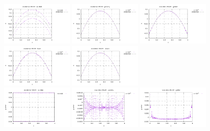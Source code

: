 \begin{center}
\includegraphics[width=3.4cm]{python_codes/fieldstone_115/results/dh/pressure_nostab.pdf}
\includegraphics[width=3.4cm]{python_codes/fieldstone_115/results/dh/pressure_penalty.pdf}
\includegraphics[width=3.4cm]{python_codes/fieldstone_115/results/dh/pressure_global.pdf}
\includegraphics[width=3.4cm]{python_codes/fieldstone_115/results/dh/pressure_local.pdf}
\includegraphics[width=3.4cm]{python_codes/fieldstone_115/results/dh/pressure_macro.pdf}\\
\includegraphics[width=3.4cm]{python_codes/fieldstone_115/results/dh/pressure_nostab_error.pdf}
\includegraphics[width=3.4cm]{python_codes/fieldstone_115/results/dh/pressure_penalty_error.pdf}
\includegraphics[width=3.4cm]{python_codes/fieldstone_115/results/dh/pressure_global_error.pdf}

\end{center}

